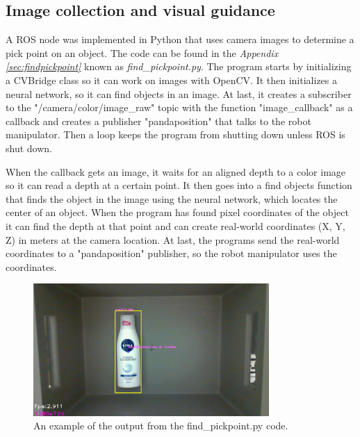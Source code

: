 \subsection{Image collection and visual guidance}\label{camera}
A ROS node was implemented in Python that uses camera images to determine a pick point on an object. The code can be found in the \textit{Appendix \ref{sec:findpickpoint}} known as \textit{find\_pickpoint.py}. 
The program starts by initializing a CVBridge class so it can work on images with OpenCV. It then initializes a neural network, so it can find objects in an image. At last, it creates a subscriber to the "/camera/color/image\_raw" topic with the function "image\_callback" as a callback and creates a publisher "pandaposition" that talks to the robot manipulator. Then a loop keeps the program from shutting down unless ROS is shut down.

When the callback gets an image, it waits for an aligned depth to a color image so it can read a depth at a certain point. It then goes into a find objects function that finds the object in the image using the neural network, which locates the center of an object. When the program has found pixel coordinates of the object it can find the depth at that point and can create real-world coordinates (X, Y, Z) in meters at the camera location. At last, the programs send the real-world coordinates to a "pandaposition" publisher, so the robot manipulator uses the coordinates.

\begin{figure}[h]
 \centering
 \includegraphics[width=0.8\textwidth]{graphics/findpickpoint.png}
 \caption{An example of the output from the find\_pickpoint.py code.}
 \label{fig:findpickpoint}
\end{figure}

